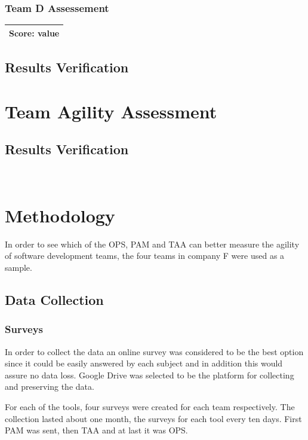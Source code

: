 \subsubsection{Team D Assessement}
\begin{tabular}{| p{3cm} | }
\hline
\textbf{Score:} value \\ \hline
\end{tabular}

\subsection{Results Verification}



\section{Team Agility Assessment}
\subsection{Results Verification}
~




\section{Methodology}
In order to see which of the OPS, PAM and TAA can better measure the agility of software development teams, the four teams in company F were used as a sample.

\subsection{Data Collection}


\subsubsection{Surveys}
In order to collect the data an online survey was considered to be the best option since it could be easily answered by each subject and in addition this would assure no data loss. Google Drive \texttrademark \cite{google_drive} was selected to be the platform for collecting and preserving the data.

For each of the tools, four surveys were created for each team respectively. The collection lasted about one month, the surveys for each tool every ten days. First PAM was sent, then TAA and at last it was OPS.

